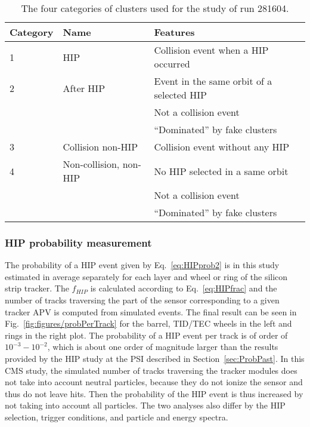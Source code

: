 \begin{table}[h]
\begin{center}
\begin{tabular}{|l|l|l|}
\hline
Category & Name  & Features \\
\hline
1 & HIP & Collision event when a HIP occurred \\
\hline
2 & After HIP & Event in the same orbit of a selected HIP \\
& & Not a collision event \\
& & ``Dominated'' by fake clusters \\
\hline
3 & Collision non-HIP & Collision event without any HIP \\
\hline
4 & Non-collision, non-HIP  & No HIP selected in a same orbit \\
& & Not a collision event \\
& & ``Dominated'' by fake clusters \\
\hline
\end{tabular}
\caption[Table caption text]{The four categories of clusters used for the study of run 281604. }
\label{tab:eventCategories}
\end{center}
\end{table}


\subsubsection{HIP probability measurement~\label{sec:HIPprob}}

The probability of a HIP event given by Eq.~\ref{eq:HIPprob2} is in this study estimated in average separately for each layer and wheel or ring of the silicon strip tracker.  The $f_{HIP}$ is calculated according to Eq.~\ref{eq:HIPfrac} and the number of tracks traversing the part of the sensor corresponding to a given tracker APV is computed from simulated events. The final result can be seen in Fig.~\ref{fig:figures/probPerTrack} for the barrel, TID/TEC wheels in the left and rings in the right plot. The probability of a HIP event per track is of order of $10^{-3}-10^{-2}$, which is about one order of magnitude larger than the results provided by the HIP study at the PSI described in Section~\ref{sec:ProbPast}. In this CMS study, the simulated number of tracks traversing the tracker modules does not take into account neutral particles, because they do not ionize the sensor and thus do not leave hits. Then the probability of the HIP event is thus increased by not taking into account all particles. The two analyses also differ by the HIP selection, trigger conditions, and particle and energy spectra.

